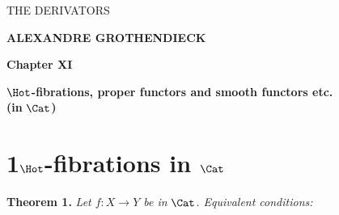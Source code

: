 \printedpage{--}

\begin{center}
\vspace*{5cm}
{\LARGE\textsf{THE DERIVATORS}}

\vspace{1.5em}
{\large\textbf{ALEXANDRE GROTHENDIECK}}

\vspace{3em}
{\large\textbf{Chapter XI}}

\vspace{0.5em}
{\large $\Hot$\textbf{-fibrations, proper functors and smooth functors etc.}\\
\textbf{(in} $\Cat$\textbf{)}}
\end{center}

\clearpage

\printedpage{--}

\vspace*{6cm}

\clearpage


\noindent


\section*{1\quad $\Hot$-fibrations in $\Cat$}

\noindent\textbf{Theorem 1.} \textit{Let $f : X \longrightarrow Y$ be in} $\Cat$\textit{. Equivalent conditions:}

